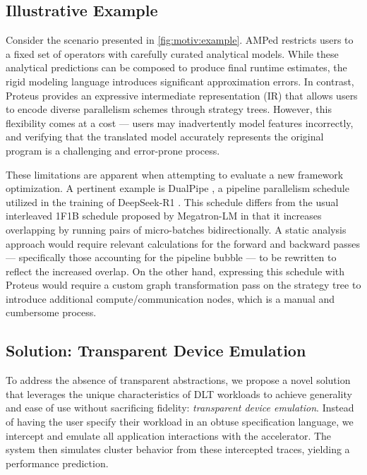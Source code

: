 \subsection{Illustrative Example}

Consider the scenario presented in \cref{fig:motiv:example}. AMPed restricts users to a fixed set of operators with carefully curated analytical models. While these analytical predictions can be composed to produce final runtime estimates, the rigid modeling language introduces significant approximation errors. In contrast, Proteus provides an expressive intermediate representation (IR) that allows users to encode diverse parallelism schemes through strategy trees. However, this flexibility comes at a cost --- users may inadvertently model features incorrectly, and verifying that the translated model accurately represents the original program is a challenging and error-prone process.

These limitations are apparent when attempting to evaluate a new framework optimization. A pertinent example is DualPipe \cite{dualpiperepo}, a pipeline parallelism schedule utilized in the training of DeepSeek-R1 \cite{deepseek}. This schedule differs from the usual interleaved 1F1B schedule proposed by Megatron-LM in that it increases overlapping by running pairs of micro-batches bidirectionally. A static analysis approach would require relevant calculations for the forward and backward passes --- specifically those accounting for the pipeline bubble --- to be rewritten to reflect the increased overlap. On the other hand, expressing this schedule with Proteus would require a custom graph transformation pass on the strategy tree to introduce additional compute/communication nodes, which is a manual and cumbersome process.



\subsection{Solution: Transparent Device Emulation}

To address the absence of transparent abstractions, we propose a novel solution that leverages the unique characteristics of DLT workloads to achieve generality and ease of use without sacrificing fidelity: \textit{transparent device emulation}. Instead of having the user specify their workload in an obtuse specification language, we intercept and emulate all application interactions with the accelerator. The system then simulates cluster behavior from these intercepted traces, yielding a performance prediction.

